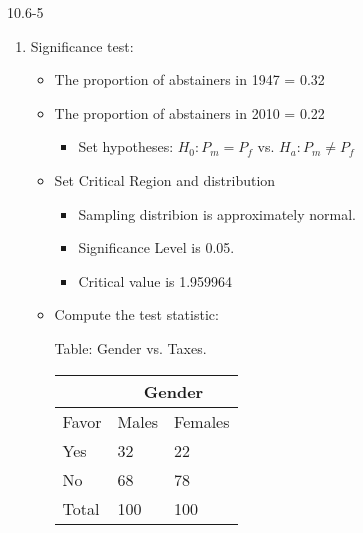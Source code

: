 \begin{exsol@solution}{10.6-5}

  	  \begin{enumerate}
	 \item Significance test:


\begin{itemize}
\item The proportion of abstainers in 1947 = 0.32
\item The proportion of abstainers in 2010 = 0.22
  \begin{itemize}
  \item Set hypotheses: $H_0: P_m = P_f$ vs. $H_a: P_m \ne P_f$
  \end{itemize}

\item Set Critical Region and distribution

  \begin{itemize}
  \item Sampling distribion is approximately normal.
  \item Significance Level is 0.05.
  \item Critical value is 1.959964
  \end{itemize}

\item Compute the test statistic:

\begin{minipage}[h]{6cm}

Table: Gender vs. Taxes.



      \begin{tabular}{@{} p{2.5cm} p{1cm} p{1cm} @{}} \hline %
     &  \multicolumn{2}{c}{Gender } \\ \hline
     Favor   & Males & Females \\ \hline
     Yes   & 32 & 22 \\
     No          & 68 & 78 \\ \hline
     Total        & 100 & 100 \\ \hline
   \end{tabular}

\end{minipage} \hfill
\begin{minipage}[h]{6cm}


\end{minipage}
\end{itemize}
\end{enumerate}
\end{exsol@solution}
